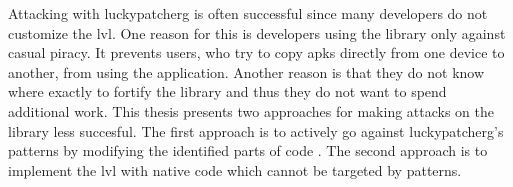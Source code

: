 Attacking with \gls{luckypatcherg} is often successful since many developers do not customize the \gls{lvl}.
One reason for this is developers using the library only against casual piracy.
It prevents users, who try to copy \gls{apk}s directly from one device to another, from using the application.
Another reason is that they do not know where exactly to fortify the library and thus they do not want to spend additional work.
This thesis presents two approaches for making attacks on the library less succesful.
\newline
The first approach is to actively go against \gls{luckypatcherg}'s patterns by modifying the identified parts of code .
\newline
The second approach is to implement the \gls{lvl} with native code which cannot be targeted by patterns. \cite{developersSecuring} \cite{munteanLicense}
